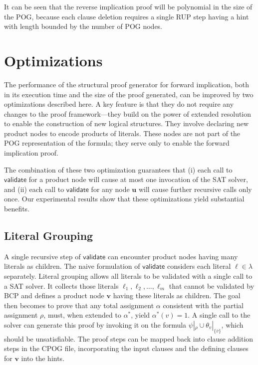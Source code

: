 \documentclass[twoside,11pt]{article}
\newcommand{\obar}[1]{\overline{#1}}
\newcommand{\lit}{\ell}
\newcommand{\extend}[1]{#1^{*}}
\newcommand{\assign}{\alpha}
\newcommand{\eassign}{\extend{\alpha}}
\newcommand{\passign}{\rho}
\newcommand{\validate}{\textsf{validate}}
\newcommand{\makenode}[1]{\mathbf{#1}}
\newcommand{\nodeu}{\makenode{u}}
\newcommand{\nodev}{\makenode{v}}
\newcommand{\simplify}[2]{#1|_{#2}}
\begin{document}
It can be seen that the reverse implication proof will be polynomial in the size of the POG\@, because
each clause deletion requires a single RUP step having a hint with length
bounded by the number of POG nodes.

\section{Optimizations}

The performance of the structural proof generator for forward implication, both in its execution time and
the size of the proof generated, can be improved by two optimizations
described here.  A key feature is that they do not require any changes
to the proof framework---they build on the power of extended
resolution to enable the construction of new logical structures.  They
involve declaring new product nodes to encode products of literals.
These nodes are not part of the POG
representation of the formula; they serve only to enable the forward
implication proof.

The combination of these two optimization guarantees that (i) each call
to $\validate$ for a product node will cause at most one invocation of
the SAT solver, and (ii) each call to $\validate$ for any node $\nodeu$
will cause further recursive calls only once.  Our experimental
results show that these
optimizations yield substantial benefits.


\subsection{Literal Grouping}
\label{sect:grouping}

A single recursive step of $\validate$ can encounter product nodes
having many literals as children.  The naive formulation of $\validate$
considers each literal $\lit \in \lambda$ separately.
Literal grouping allows all literals to be validated with a single call to a SAT solver.
It collects those literals
$\lit_1, \lit_2, \ldots, \lit_m$ that cannot be validated by BCP and defines a
product node $\nodev$ having these literals as children.  The goal
then becomes to prove that any total assignment $\assign$ consistent with the partial assignment $\passign$,
must, when extended to $\eassign$, yield $\eassign(v) = 1$.
A single call to the solver can generate this proof by invoking it on the formula
  $\simplify{\psi}{\passign} \cup \simplify{\theta_{v}}{\{ \obar{v} \}}$, which should be unsatisfiable.
  The proof steps can be mapped back into clause addition steps in the CPOG file, incorporating the
  input clauses and the defining clauses for $\nodev$ into the hints.
\end{document}
